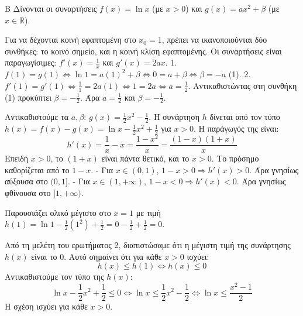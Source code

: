 \begin{thema}{Β}
Δίνονται οι συναρτήσεις $f(x) = \ln x$ (με $x>0$) και $g(x) = a x^2 + \beta$ (με $x \in \mathbb{R}$). 
\begin{erwthma}
\item Για να δέχονται κοινή εφαπτομένη στο $x_0=1$, πρέπει να ικανοποιούνται δύο συνθήκες: το κοινό σημείο, και η κοινή κλίση εφαπτομένης.
Οι συναρτήσεις είναι παραγωγίσιμες: $f'(x) = \frac{1}{x}$ και $g'(x) = 2ax$.
1. $f(1) = g(1) \Leftrightarrow \ln 1 = a(1)^2 + \beta \Leftrightarrow 0 = a + \beta \Leftrightarrow \beta = -a$ (1).
2. $f'(1) = g'(1) \Leftrightarrow \frac{1}{1} = 2a(1) \Leftrightarrow 1 = 2a \Leftrightarrow a = \frac{1}{2}$.
Αντικαθιστώντας στη συνθήκη (1) προκύπτει $\beta = -\frac{1}{2}$.
Άρα $a=\frac{1}{2}$ και $\beta=-\frac{1}{2}$.

\item Αντικαθιστούμε τα $a, \beta$: $g(x) = \frac{1}{2}x^2 - \frac{1}{2}$.
Η συνάρτηση $h$ δίνεται από τον τύπο $h(x) = f(x) - g(x) = \ln x - \frac{1}{2}x^2 + \frac{1}{2}$ για $x>0$.
Η παράγωγός της είναι:
\[ h'(x) = \frac{1}{x} - x = \frac{1-x^2}{x} = \frac{(1-x)(1+x)}{x} \]
Επειδή $x>0$, το $(1+x)$ είναι πάντα θετικό, και το $x > 0$. Το πρόσημο καθορίζεται από το $1-x$.
- Για $x \in (0, 1)$, $1-x > 0 \Rightarrow h'(x) > 0$. Άρα γνησίως αύξουσα στο $(0, 1]$.
- Για $x \in (1, +\infty)$, $1-x < 0 \Rightarrow h'(x) < 0$. Άρα γνησίως φθίνουσα στο $[1, +\infty)$.
\begin{center}
\end{center}
Παρουσιάζει ολικό μέγιστο στο $x=1$ με τιμή $h(1) = \ln 1 - \frac{1}{2}(1^2) + \frac{1}{2} = 0 - \frac{1}{2} + \frac{1}{2} = 0$.

\item Από τη μελέτη του ερωτήματος 2, διαπιστώσαμε ότι η μέγιστη τιμή της συνάρτησης $h(x)$ είναι το 0. 
Αυτό σημαίνει ότι για κάθε $x > 0$ ισχύει:
\[ h(x) \le h(1) \Leftrightarrow h(x) \le 0 \]
Αντικαθιστούμε τον τύπο της $h(x)$:
\[ \ln x - \frac{1}{2}x^2 + \frac{1}{2} \le 0 \Leftrightarrow \ln x \le \frac{1}{2}x^2 - \frac{1}{2} \Leftrightarrow \ln x \le \frac{x^2-1}{2} \]
Η σχέση ισχύει για κάθε $x > 0$.


\end{erwthma}
\end{thema}
